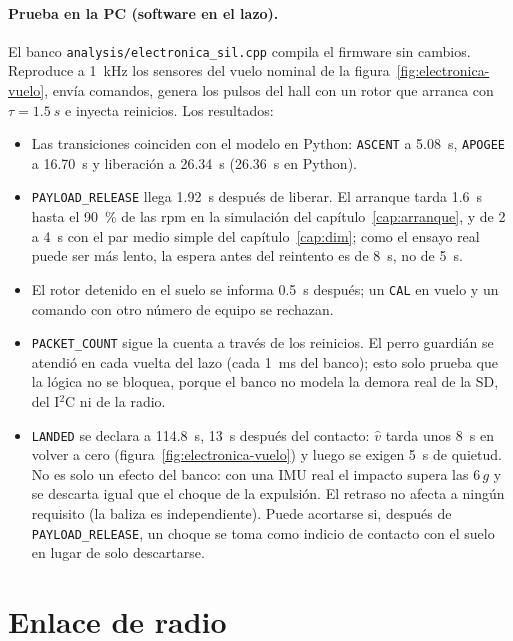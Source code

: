\paragraph{Prueba en la PC (software en el lazo).} El banco
\texttt{analysis/electronica\_sil.cpp} compila el firmware sin cambios. Reproduce a
\SI{1}{kHz} los sensores del vuelo nominal de la figura~\ref{fig:electronica-vuelo}, envía
comandos, genera los pulsos del hall con un rotor que arranca con $\tau=\SI{1.5}{s}$ e
inyecta reinicios. Los resultados:
\begin{itemize}
  \item Las transiciones coinciden con el modelo en Python: \texttt{ASCENT} a
        \SI{5.08}{s}, \texttt{APOGEE} a \SI{16.70}{s} y liberación a \SI{26.34}{s}
        (\SI{26.36}{s} en Python).
  \item \texttt{PAYLOAD\_RELEASE} llega \SI{1.92}{s} después de liberar. El arranque
        tarda \SI{1.6}{s} hasta el \SI{90}{\percent} de las rpm en la simulación del
        capítulo~\ref{cap:arranque}, y de 2 a \SI{4}{s} con el par medio simple del
        capítulo~\ref{cap:dim}; como el ensayo real puede ser más lento, la espera antes del
        reintento es de \SI{8}{s}, no de \SI{5}{s}.
  \item El rotor detenido en el suelo se informa \SI{0.5}{s} después; un \texttt{CAL} en
        vuelo y un comando con otro número de equipo se rechazan.
  \item \texttt{PACKET\_COUNT} sigue la cuenta a través de los reinicios. El perro guardián
        se atendió en cada vuelta del lazo (cada \SI{1}{ms} del banco); esto solo prueba que
        la lógica no se bloquea, porque el banco no modela la demora real de la SD, del
        I$^2$C ni de la radio.
  \item \texttt{LANDED} se declara a \SI{114.8}{s}, \SI{13}{s} después del contacto: $\hat v$
        tarda unos \SI{8}{s} en volver a cero (figura~\ref{fig:electronica-vuelo}) y luego
        se exigen \SI{5}{s} de quietud. No es solo un efecto del banco: con una IMU real el
        impacto supera las $6\,g$ y se descarta igual que el choque de la expulsión. El
        retraso no afecta a ningún requisito (la baliza es independiente). Puede acortarse
        si, después de \texttt{PAYLOAD\_RELEASE}, un choque se toma como indicio de contacto
        con el suelo en lugar de solo descartarse.
\end{itemize}

\section{Enlace de radio}\label{sec:electronica-rf}

